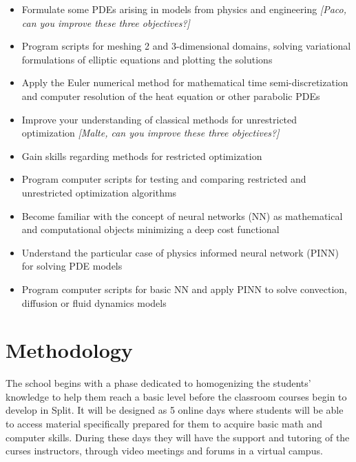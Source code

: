\documentclass[letterpaper]{inzane_syllabus} %
\begin{document}
\begin{itemize}
  \item Formulate some PDEs arising in models from physics and engineering \emph{\color{myCOLOR} [Paco, can you improve these three objectives?]}
  \item Program 
    scripts for meshing 2 and 3-dimensional domains, solving variational formulations of elliptic equations and plotting the solutions
  \item Apply the Euler numerical method for mathematical time semi-discretization and computer resolution of the heat equation or other parabolic PDEs
  \item Improve your understanding of classical methods for unrestricted optimization \emph{\color{myCOLOR} [Malte, can you improve these three objectives?]}
  \item Gain skills regarding methods for restricted optimization 
  \item Program computer scripts for testing and comparing restricted and unrestricted optimization algorithms 
  \item Become familiar with the concept of  neural networks (NN) as mathematical and computational objects minimizing a deep cost functional
  \item Understand the particular case of physics informed neural network (PINN) for solving PDE models
  \item Program computer scripts for basic NN and apply PINN to solve convection, diffusion or fluid dynamics models

\end{itemize}


\vspace{0.5cm} 
\section{Methodology}

The school begins with a phase dedicated to homogenizing the students' knowledge to help them reach a basic level before the classroom courses begin to develop in Split. It will be designed as 5 online days where students will be able to access material specifically prepared for them to acquire basic math and computer skills. During these days they will have the support and tutoring of the curses instructors, through video meetings and forums in a virtual campus.
\end{document}
